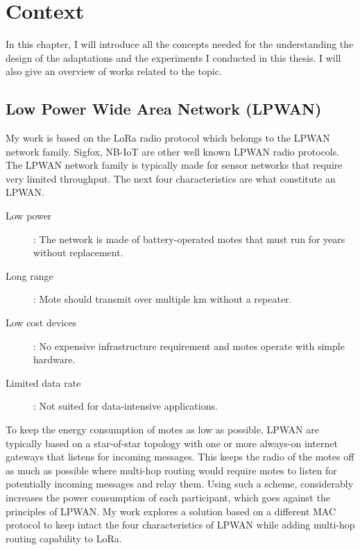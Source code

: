 \chapter{Context\label{section:context}}

In this chapter, I will introduce all the concepts needed for the understanding
the design of the adaptations and
the experiments I conducted in this thesis.
I will also give an overview of works related to the topic.

\section{Low Power Wide Area Network (LPWAN)\label{section:lpwan}}

My work is based on the LoRa radio protocol which belongs to the LPWAN network
family.
Sigfox, NB-IoT are other well known LPWAN radio protocols.
The LPWAN network family is typically made for sensor networks that require
very limited throughput.
The next four characteristics are what constitute an LPWAN.

\begin{description}
  \item[Low power]: The network is made of battery-operated
    motes that must run for years without replacement.
  \item[Long range]: Mote should transmit over multiple km without a repeater.
  \item[Low cost devices]: No expensive infrastructure requirement and motes
    operate with simple hardware.
  \item[Limited data rate]: Not suited for data-intensive applications.
\end{description}

To keep the energy consumption of motes as low as possible, LPWAN are typically
based on a star-of-star topology with one or more always-on internet gateways
that listens for incoming messages.
This keeps the radio of the motes off as much as possible where multi-hop routing
would require motes to listen for potentially incoming messages and
relay them.
Using such a scheme, considerably increases the power consumption of each
participant, which goes against the principles of LPWAN.
My work explores a solution based on a different MAC protocol to keep intact the
four characteristics of LPWAN while adding multi-hop routing capability to LoRa.

\paragraph{}

